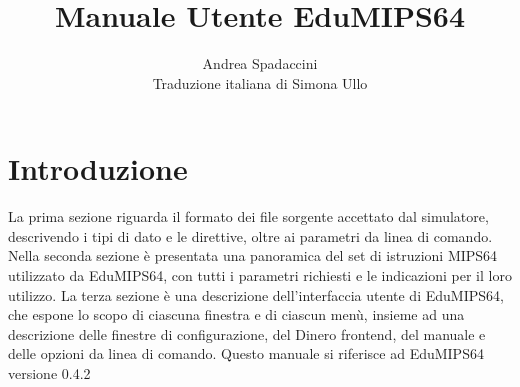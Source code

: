 \documentclass[12pt]{report}
\author{Andrea Spadaccini\\Traduzione italiana di Simona Ullo}
\title{Manuale Utente EduMIPS64 \EV}
\newcommand{\EM}{EduMIPS64}
\newcommand{\EV}{0.4.2}
\newcommand{\MS}{MIPS64}
\begin{document}
\setlength{\baselineskip}{1.60\baselineskip} %

\newlength{\centeroffset}
\setlength{\centeroffset}{-0.5\oddsidemargin}
\addtolength{\centeroffset}{0.5\evensidemargin}
\thispagestyle{empty}
\noindent\hspace*{\centeroffset}

\noindent\hspace*{\centeroffset}



\pagebreak

\tableofcontents
\listoftables
\lstlistoflistings
\chapter{Introduzione}
La prima sezione riguarda il formato dei file sorgente accettato dal simulatore,
descrivendo i tipi di dato e le direttive, oltre ai parametri da linea di comando.
Nella seconda sezione \`{e} presentata una panoramica del set di istruzioni  \MS{}
utilizzato da \EM{}, con tutti i parametri richiesti e le indicazioni per il loro utilizzo.
La terza sezione \`{e} una descrizione dell'interfaccia utente di \EM{}, 
che espone lo scopo di ciascuna finestra e di ciascun men\`{u}, insieme ad una descrizione 
delle finestre di configurazione, del Dinero frontend, del manuale e delle opzioni da linea di comando. 
Questo manuale si riferisce ad EduMIPS64 versione \EV{}
\end{document}
